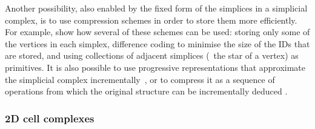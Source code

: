 Another possibility, also enabled by the fixed form of the simplices in a simplicial complex, is to use compression schemes in order to store them more efficiently.
For example, \citet{Blandford05} show how several of these schemes can be used: storing only some of the vertices in each simplex, difference coding to minimise the size of the IDs that are stored, and using collections of adjacent simplices (\eg\ the star of a vertex) as primitives.
It is also possible to use progressive representations that approximate the simplicial complex incrementally~\citep{Popovic97}, or to compress it as a sequence of operations from which the original structure can be incrementally deduced \citep{Rossignac99}.

\subsubsection{2D cell complexes}

